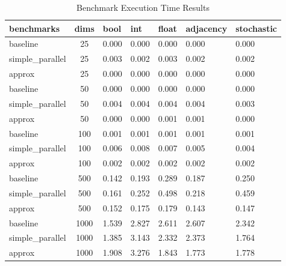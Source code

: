 \documentclass[oneside]{article}
\begin{document}
\begin{table}[ht!]
\centering
\caption{Benchmark Execution Time Results}
{\renewcommand{\arraystretch}{1.15}}
\begin{tabular}{|l|c|l|l|l|l|l|} \hline
benchmarks&        dims&       bool&        int&       float&    adjacency&    stochastic\\ \hline
baseline&             25&      0.000&       0.000&     0.000&    0.000&     0.000\\ \hline
simple\_parallel&     25&      0.003&       0.002&     0.003&    0.002&     0.002\\ \hline
approx&               25&      0.000&       0.000&     0.000&    0.000&     0.000\\ \hline
baseline&             50&      0.000&       0.000&     0.000&    0.000&     0.000\\ \hline
simple\_parallel&     50&      0.004&       0.004&     0.004&    0.004&     0.003\\ \hline
approx&               50&      0.000&       0.000&     0.001&    0.001&     0.000\\ \hline
baseline&            100&      0.001&       0.001&     0.001&    0.001&     0.001\\ \hline
simple\_parallel&    100&      0.006&       0.008&     0.007&    0.005&     0.004\\ \hline
approx&              100&      0.002&       0.002&     0.002&    0.002&     0.002\\ \hline
baseline&            500&      0.142&       0.193&     0.289&    0.187&     0.250\\ \hline
simple\_parallel&    500&      0.161&       0.252&     0.498&    0.218&     0.459\\ \hline
approx&              500&      0.152&       0.175&     0.179&    0.143&     0.147\\ \hline
baseline&           1000&      1.539&       2.827&     2.611&    2.607&     2.342\\ \hline
simple\_parallel&   1000&      1.385&       3.143&     2.332&    2.373&     1.764\\ \hline
approx&             1000&      1.908&       3.276&     1.843&    1.773&     1.778\\ \hline
\end{tabular}
\label{table:benchmark}
\end{table}
\end{document}

